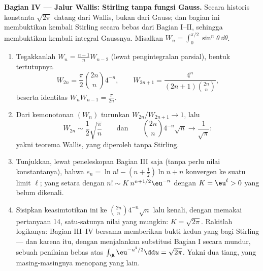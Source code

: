 \begin{problem}
\medskip
\noindent\textbf{Bagian IV --- Jalur Wallis: Stirling
tanpa fungsi Gauss.} Secara historis konstanta $\sqrt{2\pi}$
datang dari Wallis, bukan dari Gauss; dan bagian ini membuktikan kembali Stirling
secara bebas dari Bagian I--II, sehingga membuktikan kembali
integral Gaussnya. Misalkan $W_n = \int_0^{\pi/2}\sin^n\theta\,
\dd\theta$.
\begin{enumerate}[resume]
  \item Tegakkanlah $W_n = \frac{n-1}nW_{n-2}$ (lewat pengintegralan
        parsial), bentuk tertutupnya
        \[
        W_{2n} = \frac\pi2\binom{2n}n4^{-n}, \qquad
        W_{2n+1} = \frac{4^n}{(2n+1)\binom{2n}n},
        \]
        beserta identitas $W_nW_{n-1} = \frac\pi{2n}$.
  \item Dari kemonotonan $(W_n)$ turunkan
        $W_{2n}/W_{2n+1} \to 1$, lalu
        \[
        W_{2n} \sim \frac12\sqrt{\frac\pi n}
        \qquad\text{dan}\qquad
        \binom{2n}n4^{-n}\sqrt n \longrightarrow
        \frac1{\sqrt\pi} :
        \]
        yakni teorema Wallis, yang diperoleh tanpa Stirling.
  \item Tunjukkan, lewat peneleskopan Bagian III saja (tanpa perlu nilai
        konstantanya), bahwa $e_n = \ln n! - (n +
        \frac12)\ln n + n$ konvergen ke suatu limit $\ell$;
        yang setara dengan $n! \sim K\,n^{n+1/2}\eu^{-n}$ dengan $K =
        \eu^\ell > 0$ yang belum dikenali.
  \item Sisipkan keasimtotikan ini ke $\binom{2n}n4^{-n}\sqrt n$
        lalu kenali, dengan memakai pertanyaan 14, satu-satunya nilai
        yang mungkin: $K = \sqrt{2\pi}$. Rakitlah logikanya: Bagian
        III--IV bersama memberikan bukti kedua yang  bagi
        Stirling --- dan karena itu, dengan menjalankan substitusi Bagian I
        secara mundur, sebuah penilaian bebas atas
        $\int_\R\eu^{-u^2/2}\dd u = \sqrt{2\pi}$. Yakni dua tiang,
        yang masing-masingnya menopang yang lain.
\end{enumerate}


\end{problem}
